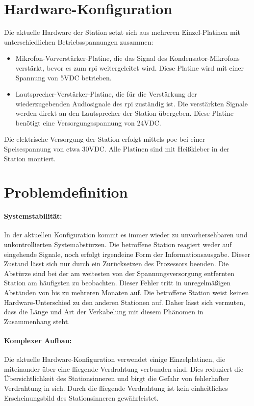 \wip
\section{Hardware-Konfiguration}
Die aktuelle Hardware der Station setzt sich aus mehreren Einzel-Platinen mit unterschiedlichen Betriebsspannungen zusammen:
\begin{itemize}
    \item Mikrofon-Vorverstärker-Platine, die das Signal des Kondensator-Mikrofons verstärkt, bevor es zum \ac{rpi} weitergeleitet wird. Diese Platine wird mit einer Spannung von 5VDC betrieben.
    \item Lautsprecher-Verstärker-Platine, die für die Verstärkung der wiederzugebenden Audiosignale des \ac{rpi} zuständig ist. Die verstärkten Signale werden direkt an den Lautsprecher der Station übergeben. Diese Platine benötigt eine Versorgungsspannung von 24VDC.
\end{itemize}
Die elektrische Versorgung der Station erfolgt mittels \ac{poe} bei einer Speisespannung von etwa 30VDC.
Alle Platinen sind mit Heißkleber in der Station montiert.

\section{Problemdefinition}
\paragraph{Systemstabilität:} %
In der aktuellen Konfiguration kommt es immer wieder zu unvorhersehbaren und unkontrollierten Systemabstürzen.
Die betroffene Station reagiert weder auf eingehende Signale, noch erfolgt irgendeine Form der Informationsausgabe.
Dieser Zustand lässt sich nur durch ein Zurücksetzen des Prozessors beenden.
Die Abstürze sind bei der am weitesten von der Spannungsversorgung entfernten Station am häufigsten zu beobachten.
Dieser Fehler tritt in unregelmäßigen Abständen von bis zu mehreren Monaten auf.
Die betroffene Station weist keinen Hardware-Unterschied zu den anderen Stationen auf.
Daher lässt sich vermuten, dass die Länge und Art der Verkabelung mit diesem Phänomen in Zusammenhang steht.

\paragraph{Komplexer Aufbau:} %
Die aktuelle Hardware-Konfiguration verwendet einige Einzelplatinen, die miteinander über eine fliegende Verdrahtung verbunden sind.
Dies reduziert die Übersichtlichkeit des Stationsinneren und birgt die Gefahr von fehlerhafter Verdrahtung in sich.
Durch die fliegende Verdrahtung ist kein einheitliches Erscheinungsbild des Stationsinneren gewährleistet.

